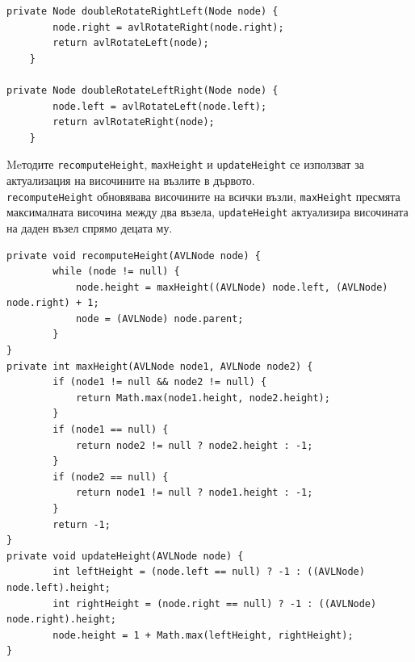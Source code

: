 \documentclass[a4paper,fleqn,12pt]{article}
\begin{document}
\newpage 
\begin{lstlisting}
private Node doubleRotateRightLeft(Node node) {
        node.right = avlRotateRight(node.right);
        return avlRotateLeft(node);
    }

private Node doubleRotateLeftRight(Node node) {
        node.left = avlRotateLeft(node.left);
        return avlRotateRight(node);
    }
\end{lstlisting}
Meтодите \texttt{recomputeHeight}, \texttt{maxHeight} и \texttt{updateHeight} се използват за актуализация на височините на възлите в дървото.  \\
\texttt{recomputeHeight} обновявава височините на всички възли, \texttt{maxHeight} пресмята максималната височина между два възела, \texttt{updateHeight} актуализира височината на даден възел спрямо децата му.
\begin{lstlisting}
private void recomputeHeight(AVLNode node) {
        while (node != null) {
            node.height = maxHeight((AVLNode) node.left, (AVLNode) node.right) + 1;
            node = (AVLNode) node.parent;
        }
}
private int maxHeight(AVLNode node1, AVLNode node2) {
        if (node1 != null && node2 != null) {
            return Math.max(node1.height, node2.height);
        }
        if (node1 == null) {
            return node2 != null ? node2.height : -1;
        }
        if (node2 == null) {
            return node1 != null ? node1.height : -1;
        }
        return -1;
}
private void updateHeight(AVLNode node) {
        int leftHeight = (node.left == null) ? -1 : ((AVLNode) node.left).height;
        int rightHeight = (node.right == null) ? -1 : ((AVLNode) node.right).height;
        node.height = 1 + Math.max(leftHeight, rightHeight);
}
\end{lstlisting}
\newpage
\end{document}
